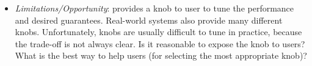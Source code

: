 \begin{itemize}
    \item \textit{Limitations/Opportunity}: \oreas{} provides a knob to user to tune the performance and desired guarantees. Real-world systems also provide many different knobs. Unfortunately, knobs are usually difficult to tune in practice, because the trade-off is not always clear. Is it reasonable to expose the knob to users? What is the best way to help users (for selecting the most appropriate knob)? 
\end{itemize}